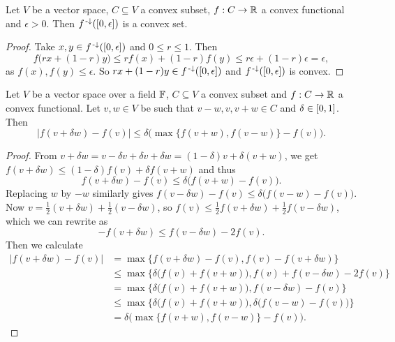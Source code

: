 \begin{lemma} \label{preimageConvexSetConvexFunctionalIsConvex}
Let $V$ be a vector space, $C\subseteq V$ a convex subset, $f:C\to \mathbb{R}$ a convex functional and $\epsilon >0$. Then $f^{\preimf}(\interval{0,\epsilon})$ is a convex set.
\end{lemma}
\begin{proof}
Take $x,y\in f^{\preimf}(\interval{0,\epsilon})$ and $0\leq r\leq 1$. Then
\[ f\big(rx + (1-r)y\big) \leq rf(x) + (1-r)f(y) \leq r\epsilon + (1-r)\epsilon = \epsilon, \]
as $f(x), f(y)\leq \epsilon$. So $rx + (1-r)y \in f^{\preimf}(\interval{0,\epsilon})$ and $f^{\preimf}(\interval{0,\epsilon})$ is convex.
\end{proof}

\begin{lemma} \label{convexContinuityLemma}
Let $V$ be a vector space over a field $\mathbb{F}$, $C\subseteq V$ a convex subset and $f:C\to \mathbb{R}$ a convex functional. Let $v,w\in V$ be such that $v-w, v, v+w\in C$ and $\delta\in \interval{0,1}$. Then
\[ |f(v+\delta w) - f(v)| \leq \delta \Big(\max\big\{ f(v+w), f(v-w) \big\} - f(v)\Big). \]
\end{lemma}
\begin{proof}
From $v+\delta w = v - \delta v + \delta v + \delta w = (1-\delta)v+\delta(v+w)$, we get $f(v+\delta w)\leq (1-\delta)f(v) + \delta f(v+w)$ and thus
\[ f(v+\delta w) - f(v)\leq \delta\big(f(v+w)- f(v)\big). \]
Replacing $w$ by $-w$ similarly gives $f(v-\delta w)-f(v)\leq \delta\big(f(v-w)- f(v)\big)$. Now $v = \frac{1}{2}(v+\delta w) + \frac{1}{2}(v-\delta w)$, so $f(v)\leq \frac{1}{2}f(v+\delta w) + \frac{1}{2}f(v-\delta w)$, which we can rewrite as
\[ -f(v+\delta w) \leq f(v-\delta w) - 2f(v). \]
Then we calculate
\begin{align*}
|f(v+\delta w) - f(v)| &= \max\big\{f(v+\delta w) - f(v), f(v) - f(v+\delta w)\big\} \\
&\leq \max\big\{\delta\big(f(v) + f(v+w)\big), f(v) + f(v-\delta w) - 2f(v)\big\} \\
&= \max\big\{\delta\big(f(v) + f(v+w)\big), f(v-\delta w) - f(v)\big\} \\
&\leq \max\big\{\delta\big(f(v) + f(v+w)\big), \delta\big(f(v-w)- f(v)\big)\big\} \\
&= \delta \Big(\max\big\{ f(v+w), f(v-w) \big\} - f(v)\Big).
\end{align*}
\end{proof}

